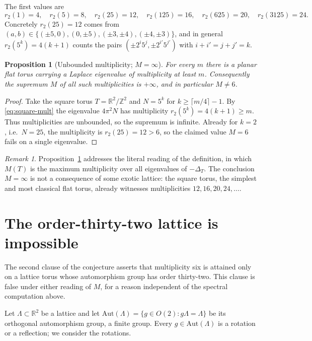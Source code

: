 \documentclass[11pt]{article}
\newtheorem{proposition}[theorem]{Proposition}
\theoremstyle{definition}
\theoremstyle{remark}
\newtheorem{remark}[theorem]{Remark}
\newcommand{\R}{\mathbb{R}}
\newcommand{\Z}{\mathbb{Z}}
\newcommand{\Lam}{\Lambda}
\newcommand{\rtwo}{r_2}
\begin{document}
The first values are
\begin{equation}
\rtwo(1)=4,\quad
\rtwo(5)=8,\quad
\rtwo(25)=12,\quad
\rtwo(125)=16,\quad
\rtwo(625)=20,\quad
\rtwo(3125)=24 .
\end{equation}
Concretely $\rtwo(25)=12$ comes from
$(a,b)\in\{(\pm5,0),(0,\pm5),(\pm3,\pm4),(\pm4,\pm3)\}$, and in general
$\rtwo(5^k)=4(k+1)$ counts the pairs $(\pm 2^i 5^{j},\pm 2^{i'}5^{j'})$ with
$i+i'=j+j'=k$.

\begin{proposition}[Unbounded multiplicity; $M=\infty$]
\label{prop:unbounded}
For every $m$ there is a planar flat torus carrying a Laplace eigenvalue of
multiplicity at least $m$.  Consequently the supremum $M$ of all such
multiplicities is $+\infty$, and in particular $M\neq6$.
\end{proposition}

\begin{proof}
Take the square torus $T=\R^2/\Z^2$ and $N=5^k$ for $k\ge \lceil m/4\rceil-1$.
By \eqref{eq:square-mult} the eigenvalue $4\pi^2 N$ has multiplicity
$\rtwo(5^k)=4(k+1)\ge m$.  Thus multiplicities are unbounded, so the supremum
is infinite.  Already for $k=2$, i.e.\ $N=25$, the multiplicity is
$\rtwo(25)=12>6$, so the claimed value $M=6$ fails on a single eigenvalue.
\end{proof}

\begin{remark}
Proposition~\ref{prop:unbounded} addresses the literal reading of the
definition, in which $M(T)$ is the maximum multiplicity over all eigenvalues
of $-\Delta_T$.  The conclusion $M=\infty$ is not a consequence of some exotic
lattice: the square torus, the simplest and most classical flat torus, already
witnesses multiplicities $12,16,20,24,\dots$.
\end{remark}

\section{The order-thirty-two lattice is impossible}
\label{sec:cryst}

The second clause of the conjecture asserts that multiplicity six is attained
only on a lattice torus whose automorphism group has order thirty-two.  This
clause is false under either reading of $M$, for a reason independent of the
spectral computation above.

Let $\Lam\subset\R^2$ be a lattice and let
$\mathrm{Aut}(\Lam)=\{g\in O(2) : g\Lam=\Lam\}$ be its orthogonal automorphism
group, a finite group.  Every $g\in\mathrm{Aut}(\Lam)$ is a rotation or a
reflection; we consider the rotations.
\end{document}
